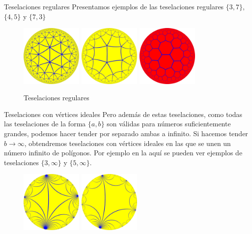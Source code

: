 \documentclass[compress]{beamer}
\begin{document}
\begin{frame}{Teselaciones regulares}
  Presentamos ejemplos de las teselaciones regulares $\{3,7\}$, $\{4,5\}$
  y $\{7,3\}$

  \begin{figure}[ht!]
    \centering
    \includegraphics[width=30mm]{./tiling-3-7.png}
    \quad
    \includegraphics[width=30mm]{./tiling-4-5.png}
    \quad
    \includegraphics[width=30mm]{./tiling-7-3.png}
    \caption{Teselaciones regulares \label{tiling}}
  \end{figure}
\end{frame}

\begin{frame}{Teselaciones con vértices ideales}
  Pero además de estas teselaciones, como todas las teselaciones de
  la forma $\{a,b\}$ son válidas para números suficientemente grandes,
  podemos hacer tender por separado ambas a infinito. Si hacemos tender
  $b \to \infty$, obtendremos teselaciones con vértices ideales en las
  que se unen un número infinito de polígonos. Por ejemplo en la
  aquí se pueden ver ejemplos de teselaciones $\{3,\infty\}$
  y $\{5,\infty\}$.

  \begin{figure}[ht!]
    \centering
    \includegraphics[width=30mm]{./tiling-3-i.png}
    \quad
    \includegraphics[width=30mm]{./tiling-5-i.png}
  \end{figure}
\end{frame}
\end{document}
